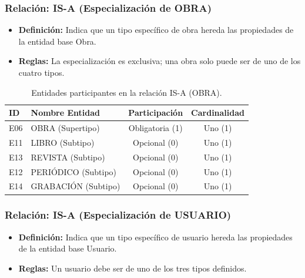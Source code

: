 	\subsubsection{Relación: IS-A (Especialización de OBRA)}
	\begin{itemize}
		\item\textbf{Definición:} Indica que un tipo específico de obra hereda las propiedades de la entidad base Obra.
		\item\textbf{Reglas:} La especialización es exclusiva; una obra solo puede ser de uno de los cuatro tipos.
	\end{itemize}
	
	\begin{table}[H]
		\centering
		\caption{Entidades participantes en la relación IS-A (OBRA).}
		\label{tab:rel_isa_obra}
		\small
		\begin{tabularx}{\textwidth}{X l c c}
			\toprule
			\textbf{ID} & \textbf{Nombre Entidad} & \textbf{Participación} & \textbf{Cardinalidad} \\
			\midrule
			E06 & OBRA (Supertipo) & Obligatoria (1) & Uno (1) \\
			\addlinespace
			E11 & LIBRO (Subtipo) & Opcional (0) & Uno (1) \\
			\addlinespace
			E13 & REVISTA (Subtipo) & Opcional (0) & Uno (1) \\
			\addlinespace
			E12 & PERIÓDICO (Subtipo) & Opcional (0) & Uno (1) \\
			\addlinespace
			E14 & GRABACIÓN (Subtipo) & Opcional (0) & Uno (1) \\
			\bottomrule
		\end{tabularx}
	\end{table}
	
	\subsubsection{Relación: IS-A (Especialización de USUARIO)}
	\begin{itemize}
		\item\textbf{Definición:} Indica que un tipo específico de usuario hereda las propiedades de la entidad base Usuario.
		\item\textbf{Reglas:} Un usuario debe ser de uno de los tres tipos definidos.
	\end{itemize}
	
